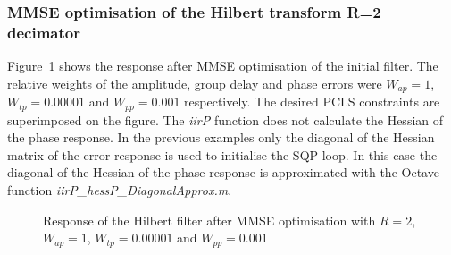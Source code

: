 \documentclass[a4paper,twoside,10pt,english]{report}
\begin{document}
\subsubsection{\label{sub:MMSE-optimisation-of-the-Hilbert-transform-R2-decimator}MMSE optimisation of the Hilbert transform  R=2 decimator}
Figure~\ref{fig:iir-sqp-slb-hilbert-mmse-response} shows the response 
after MMSE optimisation of the initial filter. The relative weights of the
amplitude, group delay and phase errors were $W_{ap}=1$, $W_{tp}=0.00001$ and 
$W_{pp}=0.001$ respectively. The desired PCLS constraints are superimposed on 
the figure. The \emph{iirP} function does not calculate the Hessian of the
phase response. In the previous
examples only the diagonal of the Hessian matrix of the error response is used
to initialise the SQP loop. In this case the diagonal of the Hessian of the
phase response is approximated with the Octave function
\emph{iirP\_hessP\_DiagonalApprox.m}.
\begin{figure}[!htbp]
\begin{center}
\scalebox{0.7}{}
\caption{Response of the Hilbert filter after MMSE optimisation with
$R=2$, $W_{ap}=1$, $W_{tp}=0.00001$ and $W_{pp}=0.001$}
\label{fig:iir-sqp-slb-hilbert-mmse-response}
\end{center}
\end{figure}
\end{document}
